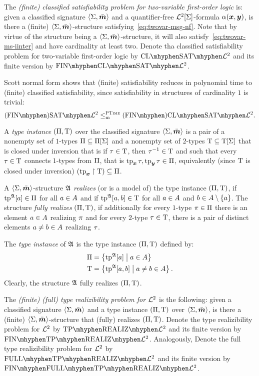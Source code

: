 \begin{definition}\label{def:clsig-twovar}
The \emph{(finite) classified satisfiability problem for two-variable
first-order logic} is:
given a classified signature $\left\langle \mathrm{\Sigma},\bar{\bm{m}} \right\rangle$ and a quantifier-free
$\mathcal{L}^{2}[\mathrm{\Sigma}]$-formula $\alpha(\bm{x},\bm{y})$, is there a (finite)
$\left\langle \mathrm{\Sigma},\bar{\bm{m}} \right\rangle$-structure satisfying~\cref{eq:twovar-msg-nf}.
Note that by virtue of the structure being a $\left\langle \mathrm{\Sigma},\bar{\bm{m}} \right\rangle$-structure, it
will also satisfy~\cref{eq:twovar-ms-iinter} and have cardinality at least two.
Denote tha classified satisfiability problem for two-variable first-order logic
by $\ClSat{\vFo2}$ and its finite version by $\FinClSat{\vFo2}$.
\end{definition}

Scott normal form shows that (finite) satisfiability reduces in polynomial time
to (finite) classified satisfiability, since satisfiability in structures of
cardinality $1$ is trivial:
\[
  \FinASat{\vFo2} \red\cP \FinAClSat{\vFo2}.
\]

\begin{definition}\label{def:tpinst-twovar}
A \emph{type instance} $(\Pi,\mathrm{T})$ over the classified
signature $\left\langle \mathrm{\Sigma},\bar{\bm{m}} \right\rangle$ is a pair of a nonempty set of $1$-types
$\Pi\subseteq\Pi[\mathrm{\Sigma}]$ and a nonempty set of $2$-types
$\mathrm{T}\subseteq\mathrm{T}[\mathrm{\Sigma}]$ that is closed under inversion
that is if $\tau \in \mathrm{T}$, then $\tau^{-1} \in \mathrm{T}$ and
such that every $\tau \in \mathrm{T}$ connects $1$-types from $\Pi$, that is
$\operatorname{tp}_{\bm{x}}\tau, \operatorname{tp}_{\bm{y}}\tau \in \Pi$, equivalently (since $\mathrm{T}$ is closed under
inversion) $(\operatorname{tp}_{\bm{x}}\restriction \mathrm{T}) \subseteq \Pi$.

A $\left\langle \mathrm{\Sigma},\bar{\bm{m}} \right\rangle$-structure $\mathfrak{A}$ \emph{realizes} (or is a model of) the
type instance $(\Pi,\mathrm{T})$, if $\operatorname{tp}^{\mathfrak{A}}[a] \in \Pi$ for all $a \in
A$ and if $\operatorname{tp}^{\mathfrak{A}}[a,b] \in \mathrm{T}$ for all $a \in A$
and $b \in A \setminus \left\{a\right\}$.
The structure \emph{fully realizes} $(\Pi,\mathrm{T})$, if additionally for every
$1$-type $\pi \in \Pi$ there is an element $a \in A$ realizing $\pi$
and for every $2$-type $\tau \in \mathrm{T}$, there is a pair of distinct elements
$a \neq b \in A$ realizing $\tau$.

The \emph{type instance} of $\mathfrak{A}$ is the type instance $(\Pi,\mathrm{T})$ defined
by:
\begin{align*}
  \Pi &= \left\{\operatorname{tp}^{\mathfrak{A}}[a]\mathrel{}\middle|\mathrel{}a\in A\right\} \\
  \mathrm{T} &= \left\{\operatorname{tp}^{\mathfrak{A}}[a,b]\mathrel{}\middle|\mathrel{}a\neq b \in A\right\}.
\end{align*}
Clearly, the structure $\mathfrak{A}$ fully realizes $(\Pi,\mathrm{T})$.

The \emph{(finite) (full) type realizibility problem for $\mathcal{L}^{2}$} is the
following:
given a classified signature $\left\langle \mathrm{\Sigma},\bar{\bm{m}} \right\rangle$ and a type instance
$(\Pi,\mathrm{T})$ over $\left\langle \mathrm{\Sigma},\bar{\bm{m}} \right\rangle$, is there a (finite)
$\left\langle \mathrm{\Sigma},\bar{\bm{m}} \right\rangle$-structure that (fully) realizes $(\Pi,\mathrm{T})$.
Denote the type realizibility problem for $\mathcal{L}^{2}$ by
$\Real{\vFo2}$ and its finite version by $\FinReal{\vFo2}$.
Analogously, Denote the full type realizibility problem for $\mathcal{L}^{2}$ by
$\FullReal{\vFo2}$ and its finite version by $\FinFullReal{\vFo2}$.
\end{definition}

